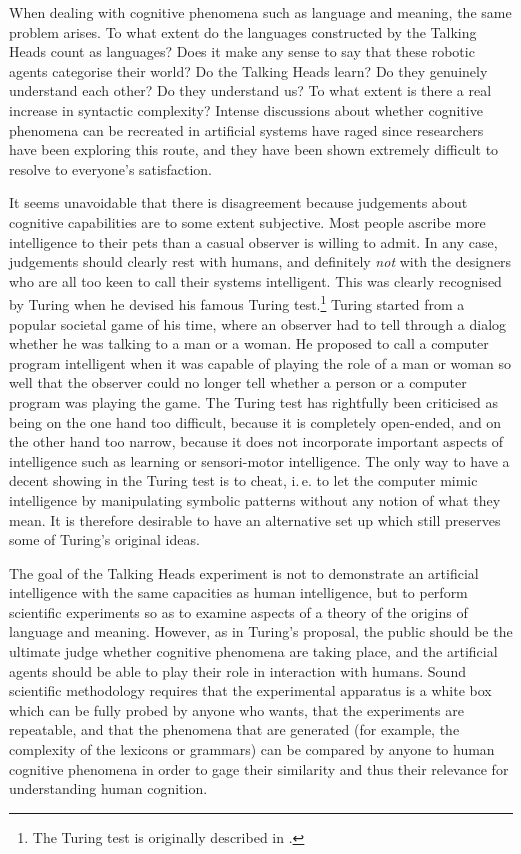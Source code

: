 When dealing with cognitive phenomena such as language
and meaning, the same problem arises. To what extent
do the languages constructed by the Talking Heads count
as languages? Does it make any sense to say that these robotic 
agents categorise their world? Do the Talking
Heads learn? Do they genuinely understand each other? Do they 
understand us? To what extent 
is there a real increase in syntactic 
complexity? Intense discussions about whether cognitive phenomena can 
be recreated in artificial systems 
have raged since researchers have been exploring this 
route, and they have been shown extremely difficult to resolve to 
everyone's satisfaction. 

It seems unavoidable that there is disagreement because 
judgements about cognitive capabilities are to some 
extent subjective. Most people ascribe more intelligence
to their pets than a casual observer is willing to admit. 
In any case, judgements should clearly rest with humans, and
definitely {\itshape not} with the designers 
who are all too keen to call their systems intelligent. 
This was clearly recognised by Turing  when he devised
his famous Turing test.\footnote{The Turing test is originally described in 
\cite{Turing:1950}.} Turing started from a popular societal 
game of his time, where an observer had to tell through
a dialog whether he was talking to a man or a woman. 
He proposed to call a computer program intelligent when 
it was capable of playing the role of a man or woman
so well that the observer could no longer tell whether
a person or a computer program was playing the game. 
The Turing test has rightfully been criticised as being
on the one hand too difficult, because it is completely 
open-ended, and on the other hand too narrow, because it 
does not incorporate important aspects of intelligence such 
as learning or sensori-motor intelligence. The only way 
to have a decent showing in the Turing test is to
cheat, i.\,e. to let the computer mimic intelligence 
by manipulating symbolic patterns without any notion of what 
they mean. It is therefore desirable to have an alternative
set up which still preserves some of Turing's original 
ideas. 

The goal of the Talking Heads experiment is not to demonstrate 
an artificial intelligence with the same capacities as 
human intelligence, but to perform
scientific experiments so as to examine aspects 
of a theory of the origins of language and meaning. 
However, as in Turing's proposal, the public should be 
the ultimate judge whether cognitive phenomena are taking
place, and the artificial agents should be able to play their role
in interaction with humans. 
Sound scientific methodology requires that 
the experimental apparatus is a white box which can be fully probed 
by anyone who wants, that the experiments are repeatable, 
and that the phenomena that are generated 
(for example, the complexity of the lexicons or 
grammars) can be 
compared by anyone to human cognitive phenomena in order to gage 
their similarity and thus their relevance for understanding
human cognition. 

